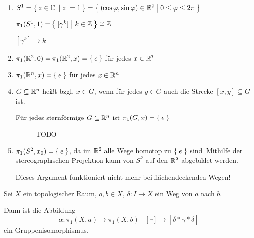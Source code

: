\begin{beispiel}
    \begin{enumerate}[label=\arabic*)]
        \item $S^1 = \Set{z \in \ensuremath{\mathbb{C}}| |z| = 1} = \Set{(\cos \varphi, \sin \varphi) \in \ensuremath{\mathbb{R}}^2 | 0 \leq \varphi \leq 2 \pi}$

              $\pi_1 (S^1, 1) = \Set{[\gamma^k] | k \in \ensuremath{\mathbb{Z}}} \cong \mathbb{Z}$

              $[\gamma^k] \mapsto k$
        \item $\pi_1 (\mathbb{R}^2, 0) = \pi_1 (\mathbb{R}^2, x) = \Set{e}$ für jedes $x \in \mathbb{R}^2$
        \item $\pi_1 (\mathbb{R}^n, x) = \Set{e}$ für jedes $x \in \mathbb{R}^n$
        \item $G \subseteq \mathbb{R}^n$ heißt bzgl. $x \in G$, 
            wenn für jedes $y \in G$ auch die Strecke $[x, y] \subseteq G$
            ist.

            Für jedes sternförmige $G \subseteq \mathbb{R}^n$ ist
            $\pi_1(G,x) = \Set{e}$


            \begin{figure}[ht]
                \centering
                \subfloat[TODO]{
                    
                    \label{fig:wege-zueinander-zusammenziehen}
                }\hspace{1em}%
                \label{fig:Gebiete}
                \caption{TODO}
            \end{figure}
        \item $\pi_1(S^2, x_0) = \Set{e}$, da im $\mathbb{R}^2$ alle Wege
              homotop zu $\Set{e}$ sind. Mithilfe der stereographischen
              Projektion kann von $S^2$ auf den $\mathbb{R}^2$ abgebildet
              werden.

              Dieses Argument funktioniert nicht mehr bei flächendeckenden
              Wegen!
    \end{enumerate}
\end{beispiel}

\begin{korollar}\label{kor:gruppenisomorphismus-wege}
    Sei $X$ ein topologischer Raum, $a,b \in X$, $\delta: I \rightarrow X$
    ein Weg von $a$ nach $b$.

    Dann ist die Abbildung
    \[\alpha: \pi_1 (X, a) \rightarrow \pi_1(X,b)\;\;\;[\gamma] \mapsto [\overline{\delta} * \gamma * \delta]\]
    ein Gruppenisomorphismus.
\end{korollar}

